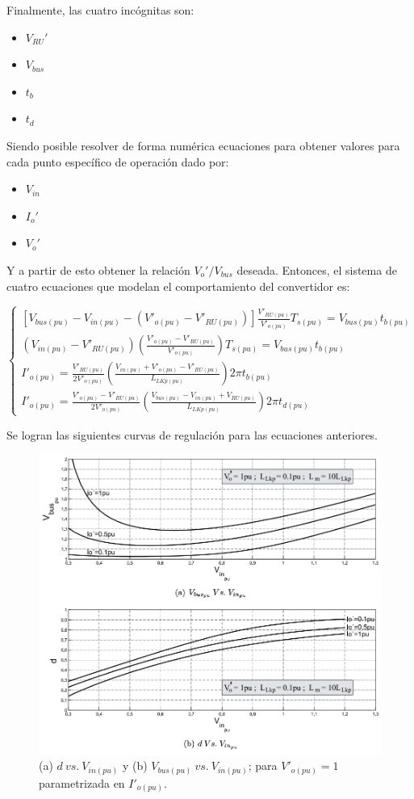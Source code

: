 Finalmente, las cuatro incógnitas son:

\begin{itemize}
	\item $V_{RU}'$
	\item $V_{bus}$
	\item $t_b$
	\item $t_d$
\end{itemize}

Siendo posible resolver de forma numérica ecuaciones para obtener valores para cada punto específico de operación dado por:

\begin{itemize}
	\item $V_{in}$
	\item $I_o'$
	\item $V_o'$
\end{itemize}

Y a partir de esto obtener la relación $V_o'/V_{bus}$ deseada. Entonces, el sistema de cuatro ecuaciones que modelan el comportamiento del convertidor es:

$$
\begin{cases}
	[V_{bus(pu)}-V_{in(pu)}-(V'_{o(pu)}-V'_{RU(pu)})]\frac{V'_{RU(pu)}}{V'_{o(pu)}}T_{s(pu)}=V_{bus(pu)}t_{b(pu)} \\
	(V_{in(pu)}-V'_{RU(pu)})\left(\frac{V'_{o(pu)}-V'_{RU(pu)}}{V'_{o(pu)}}\right)T_{s(pu)}=V_{bus(pu)}t_{b(pu)} \\
	I'_{o(pu)} = \frac{V'_{RU(pu)}}{2V'_{o(pu)}} \left(\frac{V_{in(pu)}+V'_{o(pu)}-V'_{RU(pu)}}{L_{LKp(pu)}}\right) 2\pi t_{b(pu)} \\
	I'_{o(pu)} = \frac{V'_{o(pu)}-V'_{RU(pu)}}{2V'_{o(pu)}} \left(\frac{V_{bus(pu)}-V_{in(pu)}+V_{RU(pu)}}{L_{LKp(pu)}}\right)2\pi t_{d(pu)}\
\end{cases}
$$

Se logran las siguientes curvas de regulación para las ecuaciones anteriores.

\begin{figure}
	\centering
	\includegraphics[width=0.9\linewidth]{img/eqV}
	\caption{(a) $d \ vs. \ V_{in(pu)}$ y (b) $V_{bus(pu)} \ vs. \ V_{in(pu)}$; para $V'_{o(pu)}=1$ parametrizada en $I'_{o(pu)}$.}
	\label{fig:eqv}
\end{figure}

